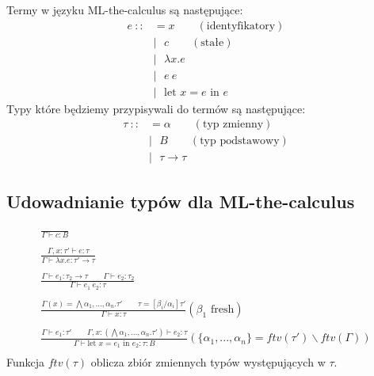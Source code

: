 \documentclass{article}
\begin{document}
Termy w języku ML-the-calculus są następujące:
\begin{equation}
  \begin{split}
    e\ ::&=x\qquad(\text{identyfikatory})\\
    &|\ \ \ c\qquad(\text{stałe})\\
    &|\ \ \ \lambda x.e\\
    &|\ \ \ e\ e\\
    &|\ \ \ \text{let }x=e\text{ in }e
  \end{split}
\end{equation}
Typy które będziemy przypisywali do termów są następujące:
\begin{equation}
  \begin{split}
    \tau\ ::&=\alpha\qquad(\text{typ zmienny})\\
    &|\ \ \ B\qquad(\text{typ podstawowy})\\
    &|\ \ \ \tau\rightarrow\tau
  \end{split}
\end{equation}
\subsection{Udowadnianie typów dla ML-the-calculus}

\begin{equation}
  \begin{split}
    \frac{}{\Gamma\vdash c:B} \\
    \\
    \frac{\Gamma,x:\tau'\vdash e:\tau}{\Gamma\vdash\lambda x.e:\tau'\rightarrow\tau} \\
    \\
    \frac{\Gamma\vdash e_1:\tau_2\rightarrow\tau\qquad\Gamma\vdash e_2:\tau_2}{\Gamma\vdash e_1\ e_2:\tau} \\
    \\
    \frac{\Gamma(x)=\bigwedge\alpha_1,...,\alpha_n.\tau'\qquad\tau=[\beta_i/\alpha_i]\tau'}{\Gamma\vdash x:\tau}(\beta_1\text{ fresh}) \\
    \\
    \frac{\Gamma\vdash e_1:\tau'\qquad\Gamma,x:(\bigwedge\alpha_1,...,\alpha_n.\tau')\vdash e_2:\tau}{\Gamma\vdash \text{let }x=e_1\text{ in }e_2:\tau:B}(\{\alpha_1,...,\alpha_n\}=ftv(\tau')\backslash ftv(\Gamma)) \\
  \end{split}
\end{equation}
Funkcja $ftv(\tau)$ oblicza zbiór zmiennych typów występujących w $\tau$.
\end{document}
